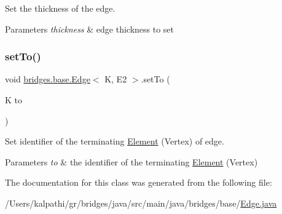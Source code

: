 Set the thickness of the edge. 


\begin{DoxyParams}{Parameters}
{\em thickness} & edge thickness to set \\
\hline
\end{DoxyParams}
\mbox{\label{classbridges_1_1base_1_1_edge_a5e574139711be3f96c42da02a2702aea}} 
\subsubsection{\texorpdfstring{setTo()}{setTo()}}
{\footnotesize\ttfamily void \mbox{\hyperlink{classbridges_1_1base_1_1_edge}{bridges.\+base.\+Edge}}$<$ K, E2 $>$.set\+To (\begin{DoxyParamCaption}\item[{K}]{to }\end{DoxyParamCaption})}



Set identifier of the terminating \mbox{\hyperlink{classbridges_1_1base_1_1_element}{Element}} (Vertex) of edge. 


\begin{DoxyParams}{Parameters}
{\em to} & the identifier of the terminating \mbox{\hyperlink{classbridges_1_1base_1_1_element}{Element}} (Vertex) \\
\hline
\end{DoxyParams}


The documentation for this class was generated from the following file\+:\begin{DoxyCompactItemize}
\item 
/\+Users/kalpathi/gr/bridges/java/src/main/java/bridges/base/\mbox{\hyperlink{_edge_8java}{Edge.\+java}}\end{DoxyCompactItemize}
